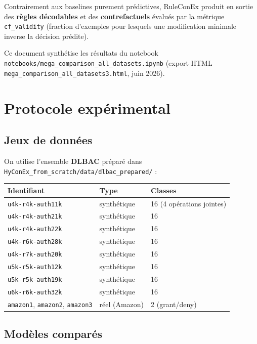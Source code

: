 \documentclass[11pt,a4paper]{article}
\begin{document}
Contrairement aux baselines purement prédictives, RuleConEx produit en sortie des \textbf{règles décodables} et des \textbf{contrefactuels} évalués par la métrique \texttt{cf\_validity} (fraction d'exemples pour lesquels une modification minimale inverse la décision prédite).

Ce document synthétise les résultats du notebook \texttt{notebooks/mega\_comparison\_all\_datasets.ipynb} (export HTML \texttt{mega\_comparison\_all\_datasets3.html}, juin 2026).

\section{Protocole expérimental}

\subsection{Jeux de données}

On utilise l'ensemble \textbf{DLBAC} préparé dans \texttt{HyConEx\_from\_scratch/data/dlbac\_prepared/} :

\begin{center}
\small
\begin{tabular}{@{}lll@{}}
\toprule
\textbf{Identifiant} & \textbf{Type} & \textbf{Classes} \\
\midrule
\texttt{u4k-r4k-auth11k} & synthétique & 16 (4 opérations jointes) \\
\texttt{u4k-r4k-auth21k} & synthétique & 16 \\
\texttt{u4k-r4k-auth22k} & synthétique & 16 \\
\texttt{u4k-r6k-auth28k} & synthétique & 16 \\
\texttt{u4k-r7k-auth20k} & synthétique & 16 \\
\texttt{u5k-r5k-auth12k} & synthétique & 16 \\
\texttt{u5k-r5k-auth19k} & synthétique & 16 \\
\texttt{u6k-r6k-auth32k} & synthétique & 16 \\
\texttt{amazon1}, \texttt{amazon2}, \texttt{amazon3} & réel (Amazon) & 2 (grant/deny) \\
\bottomrule
\end{tabular}
\end{center}

\subsection{Modèles comparés}
\end{document}
